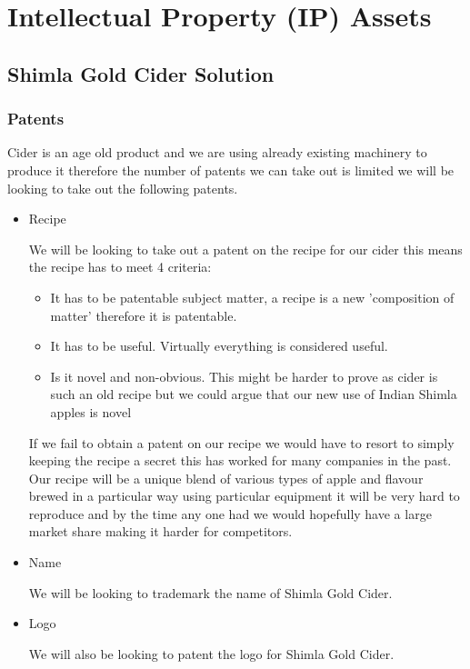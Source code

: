 \documentclass[11pt]{article}
\begin{document}
\newpage


\section{Intellectual Property (IP) Assets}
  \subsection{Shimla Gold Cider Solution}
    \subsubsection{Patents}
Cider is an age old product and we are using already existing machinery to
produce it therefore the number of patents we can take out is limited we will be
looking to take out the following patents.

\begin{itemize}

\item Recipe

We will be looking to take out a patent on the recipe for our cider this means 
the recipe has to meet 4 criteria:
 	      \begin{itemize}
		    \item It has to be patentable subject matter, a recipe is a new 
'composition of matter' therefore it is patentable.
		    \item It has to be useful. Virtually everything is considered useful.
		    \item Is it novel and non-obvious. This might be harder to prove as 
cider is such an old recipe but we could argue that our new use of Indian 
Shimla apples is novel
	      \end{itemize}
If we fail to obtain a patent on our recipe we would have to resort to simply
keeping the recipe a secret this has worked for many companies in the past. Our
recipe will be a unique blend of various types of apple and flavour brewed in a
particular way using particular equipment it will be very hard to reproduce and
by the time any one had we would hopefully have a large market share making it
harder for competitors.

\item Name

We will be looking to trademark the name of Shimla Gold Cider.

\item Logo

We will also be looking to patent the logo for Shimla Gold Cider.
\end{itemize}
\end{document}
